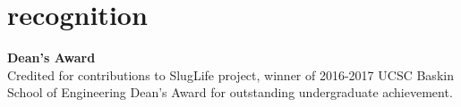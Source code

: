 \documentclass[]{./friggeri-cv}
\begin{document}
    \section{recognition}
    {\bf Dean's Award}\\
    Credited for contributions to SlugLife project, winner of
    2016-2017 UCSC Baskin School of Engineering Dean's Award for outstanding
    undergraduate achievement.
\end{document}
